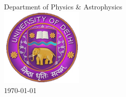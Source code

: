 \begin{titlepage}
\begin{center}
{\color{red!50!black}Department of Physics \& Astrophysics}\\[0.3cm] %
 
\includegraphics[width=4cm]{figures/logo_du.jpg}\\
{\large \monthyeardate\today}\\ %
 
\vfill
\end{center}
\end{titlepage}
